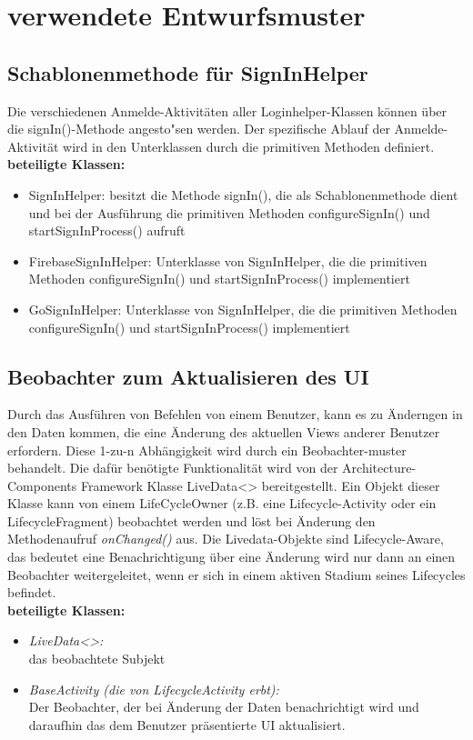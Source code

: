 \documentclass[parskip=full]{scrartcl}
\begin{document}
\newpage


\section{verwendete Entwurfsmuster}

\subsection{Schablonenmethode für SignInHelper}
Die verschiedenen Anmelde-Aktivitäten aller Loginhelper-Klassen können über die signIn()-Methode angesto"sen werden. Der spezifische Ablauf der Anmelde-Aktivität wird in den Unterklassen durch die primitiven Methoden definiert. \\

\textbf{beteiligte Klassen:}
\begin{itemize}
	\item SignInHelper: besitzt die Methode signIn(), die als Schablonenmethode dient und bei der Ausführung die primitiven Methoden configureSignIn() und startSignInProcess() aufruft
	\item FirebaseSignInHelper: Unterklasse von SignInHelper, die die primitiven Methoden configureSignIn() und startSignInProcess() implementiert
	\item GoSignInHelper: Unterklasse von SignInHelper, die die primitiven Methoden configureSignIn() und startSignInProcess() implementiert
\end{itemize}

\subsection{Beobachter zum Aktualisieren des UI}
Durch das Ausführen von Befehlen von einem Benutzer, kann es zu Änderngen in den Daten kommen, die eine Änderung des aktuellen Views anderer Benutzer erfordern. Diese 1-zu-n Abhängigkeit wird durch ein Beobachter-muster behandelt. Die dafür benötigte Funktionalität wird von der Architecture-Components Framework Klasse LiveData<> bereitgestellt. Ein Objekt dieser Klasse kann von einem LifeCycleOwner (z.B. eine Lifecycle-Activity oder ein LifecycleFragment) beobachtet werden und löst bei Änderung den Methodenaufruf \textit{onChanged()} aus. Die Livedata-Objekte sind Lifecycle-Aware, das bedeutet eine Benachrichtigung über eine Änderung wird nur dann an einen Beobachter weitergeleitet, wenn er sich in einem aktiven Stadium seines Lifecycles befindet.\\
\textbf{beteiligte Klassen:}
\begin{itemize}
	\item \textit{LiveData<>:}\\ das beobachtete Subjekt
	\item \textit{BaseActivity (die von LifecycleActivity erbt):}\\ Der Beobachter, der bei Änderung der Daten benachrichtigt wird und daraufhin das dem Benutzer präsentierte UI aktualisiert.
\end{itemize}
\end{document}
